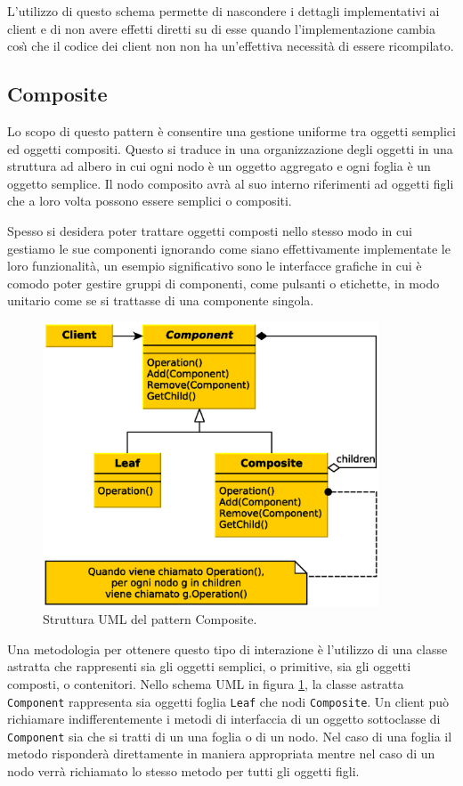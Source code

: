 L'utilizzo di questo schema permette di nascondere i dettagli implementativi ai client e di non avere effetti diretti su di esse quando l'implementazione cambia cos{\`\i} che il codice dei client non non ha un'effettiva necessit\`a di essere ricompilato. 

\subsection{Composite}
\label{sub:composite}
Lo scopo di questo pattern \`e consentire una gestione uniforme tra oggetti semplici ed oggetti compositi. Questo si traduce in una organizzazione degli oggetti in una struttura ad albero in cui ogni nodo \`e un oggetto aggregato e ogni foglia \`e un oggetto semplice.
Il nodo composito avr\`a al suo interno riferimenti ad oggetti figli che a loro volta possono essere semplici o compositi.

Spesso si desidera poter trattare oggetti composti nello stesso modo in cui gestiamo le sue componenti ignorando come siano effettivamente implementate le loro funzionalit\`a, un esempio significativo sono le interfacce grafiche in cui \`e comodo poter gestire gruppi di componenti, come pulsanti o etichette, in modo unitario come se si trattasse di una componente singola.

\begin{figure}
\begin{center}
\includegraphics[width=10cm]{Immagini/CompositePattern}
\caption{Struttura UML del pattern Composite.\label{f:compositepattern}} 
\end{center} 
\end{figure}

Una metodologia per ottenere questo tipo di interazione \`e l'utilizzo di una classe astratta che rappresenti sia gli oggetti semplici, o primitive, sia gli oggetti composti, o contenitori. Nello schema \ac{UML} in figura \ref{f:compositepattern}, la classe astratta \texttt{Component} rappresenta sia oggetti foglia \texttt{Leaf} che nodi \texttt{Composite}. Un client pu\`o richiamare indifferentemente i metodi di interfaccia di un oggetto sottoclasse di \texttt{Component} sia che si tratti di un una foglia o di un nodo. Nel caso di una foglia il metodo risponder\`a direttamente in maniera appropriata mentre nel caso di un nodo verr\`a richiamato lo stesso metodo per tutti gli oggetti figli.

